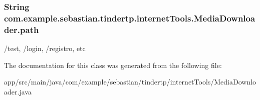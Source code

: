 \subsubsection[{\texorpdfstring{path}{path}}]{\setlength{\rightskip}{0pt plus 5cm}String com.\+example.\+sebastian.\+tindertp.\+internet\+Tools.\+Media\+Downloader.\+path\hspace{0.3cm}{\ttfamily [protected]}}\hypertarget{classcom_1_1example_1_1sebastian_1_1tindertp_1_1internetTools_1_1MediaDownloader_a99ab591fedeaa392762bf534499a2279}{}\label{classcom_1_1example_1_1sebastian_1_1tindertp_1_1internetTools_1_1MediaDownloader_a99ab591fedeaa392762bf534499a2279}
/test, /login, /registro, etc 

The documentation for this class was generated from the following file\+:\begin{DoxyCompactItemize}
\item 
app/src/main/java/com/example/sebastian/tindertp/internet\+Tools/Media\+Downloader.\+java\end{DoxyCompactItemize}
